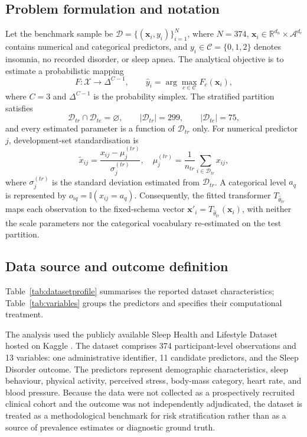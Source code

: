 \documentclass[a4paper,fleqn]{cas-dc}
\begin{document}
\subsection{Problem formulation and notation}
Let the benchmark sample be $\mathcal{D}=\{(\mathbf{x}_i,y_i)\}_{i=1}^{N}$, where $N=374$, $\mathbf{x}_i\in\mathbb{R}^{d_n}\times\mathcal{A}^{d_c}$ contains numerical and categorical predictors, and $y_i\in\mathcal{C}=\{0,1,2\}$ denotes insomnia, no recorded disorder, or sleep apnea. The analytical objective is to estimate a probabilistic mapping
\\
\begin{equation}
F:\mathcal{X}\rightarrow\Delta^{C-1},\qquad
\hat y_i=\arg\max_{c\in\mathcal{C}}F_c(\mathbf{x}_i),
\label{eq:problem}
\end{equation}
where $C=3$ and $\Delta^{C-1}$ is the probability simplex. The stratified partition satisfies
\begin{equation}
\mathcal{D}_{tr}\cap\mathcal{D}_{te}=\varnothing,
\qquad |\mathcal{D}_{tr}|=299,
\qquad |\mathcal{D}_{te}|=75,
\label{eq:partition}
\end{equation}
and every estimated parameter is a function of $\mathcal{D}_{tr}$ only. For numerical predictor $j$, development-set standardisation is
\begin{equation}
\widetilde{x}_{ij}=\frac{x_{ij}-\mu^{(tr)}_j}{\sigma^{(tr)}_j},
\quad
\mu^{(tr)}_j=\frac{1}{n_{tr}}\sum_{i\in\mathcal{D}_{tr}}x_{ij},
\label{eq:standardise}
\end{equation}
where $\sigma^{(tr)}_j$ is the standard deviation estimated from $\mathcal{D}_{tr}$. A categorical level $a_q$ is represented by $o_{iq}=\mathbb{I}(x_{ij}=a_q)$. Consequently, the fitted transformer $T_{\widehat{\theta}_{tr}}$ maps each observation to the fixed-schema vector $\mathbf{x}'_i=T_{\widehat{\theta}_{tr}}(\mathbf{x}_i)$, with neither the scale parameters nor the categorical vocabulary re-estimated on the test partition.

\subsection{Data source and outcome definition}
\label{sec:data}
Table~\ref{tab:datasetprofile} summarises the reported dataset characteristics; Table~\ref{tab:variables} groups the predictors and specifies their computational treatment.

The analysis used the publicly available Sleep Health and Lifestyle Dataset hosted on Kaggle \cite{kaggle2023}. The dataset comprises 374 participant-level observations and 13 variables: one administrative identifier, 11 candidate predictors, and the Sleep Disorder outcome. The predictors represent demographic characteristics, sleep behaviour, physical activity, perceived stress, body-mass category, heart rate, and blood pressure. Because the data were not collected as a prospectively recruited clinical cohort and the outcome was not independently adjudicated, the dataset is treated as a methodological benchmark for risk stratification rather than as a source of prevalence estimates or diagnostic ground truth.
\end{document}

